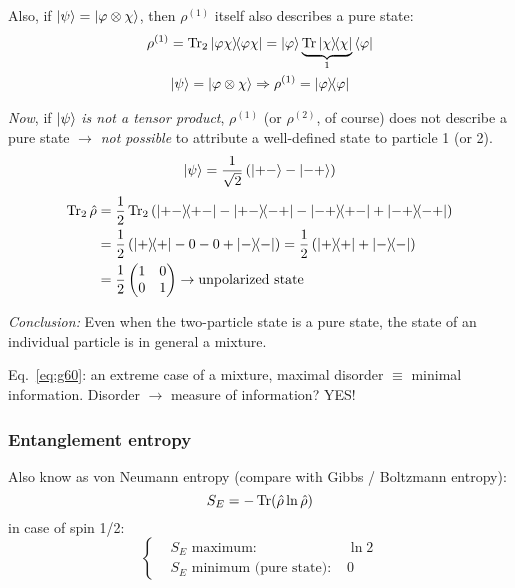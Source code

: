\documentclass[12pt]{article}
\newcommand{\be}{\begin{equation}}
\newcommand{\ee}{\end{equation}}
\begin{document}
Also, if $\ket{\psi} = \ket{\varphi\otimes\chi}$, then $\rho^{(1)}$ itself also describes a
pure state:
\be
\begin{gathered}
\rho^{(1)} = \Tr_2 \op{\varphi\chi}{\varphi\chi} = \ket{\varphi}
\underbrace{\Tr\op{\chi}{\chi}}_{1}
\bra{\varphi}\\
\ket{\psi} = \ket{\varphi\otimes\chi} \Rightarrow \rho^{(1)} = \op{\varphi}{\varphi}
\end{gathered}
\ee

\emph{Now}, if $\ket{\psi}$ \emph{is not a tensor product},
$\rho^{(1)}$ (or $\rho^{(2)}$, of course) does not describe
a pure state $\to$ \emph{not possible} to attribute a
well-defined state to particle 1 (or 2).
\[
\ket{\psi} = \frac{1}{\sqrt{2}}\left(\ket{+-}-\ket{-+}\right)
\]
\be
\begin{aligned}
\Tr_2\hat{\rho} 
&= \frac{1}{2}\Tr_2\left(
\op{+-}{+-} - 
\op{+-}{-+} -
\op{-+}{+-} +
\op{-+}{-+}
\right)\\
&=\frac{1}{2}\left(
\op{+}{+} -0 -0 + \op{-}{-} 
\right)
=\frac{1}{2}\left(
\op{+}{+} + \op{-}{-} 
\right)\\
&=\frac{1}{2}
\begin{pmatrix}
1 & 0\\0 & 1
\end{pmatrix}
\to\text{unpolarized state}
\end{aligned}
\label{eq:g60}
\ee

\emph{Conclusion:} Even when the two-particle state is
a pure state, the state of an
individual particle is in general
a mixture.

Eq.~\eqref{eq:g60}: an extreme case of a mixture, maximal
disorder $\equiv$ minimal information.
Disorder $\to$ measure of information? YES!

\subsubsection{Entanglement entropy}

Also know as von Neumann entropy (compare with Gibbs / Boltzmann entropy):
\be
S_E = -\Tr(\hat{\rho}\ln\hat{\rho})
\ee
in case of spin 1/2:
\be
\left\{
\begin{aligned}
&S_E \text{ maximum: }              & \ln2\\
&S_E \text{ minimum (pure state): } & 0 
\end{aligned}
\right.
\ee
\end{document}
